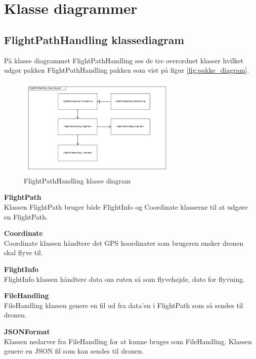 \section{Klasse diagrammer}

\subsection{FlightPathHandling klassediagram}
På klasse diagrammet FlightPathHandling ses de tre overordnet klasser hvilket udgør pakken FlightPathHandling pakken som vist på figur \ref{fig:pakke_diagram}.

\vspace{-5pt}
\begin{figure}[H]
	\centering
	\includegraphics[width=0.7\textwidth]{Billeder/klasse_diagrammer/FlightPathHandlingDiagram.png}
	\vspace{-5pt}
	\caption{FlightPathHandling klasse diagram}
	\label{fig:FlightPathHandling_klasse_diagram}
\end{figure}

\textbf{FlightPath}\\
Klassen FlightPath bruger både FlightInfo og Coordinate klasserne til at udgøre en FlightPath.

\textbf{Coordinate}\\
Coordinate klassen håndtere det GPS koordinater som brugeren ønsker dronen skal flyve til.

\textbf{FlightInfo}\\
FlightInfo klassen håndtere data om ruten så som flyvehøjde, dato for flyvning.

\textbf{FileHandling}\\
FileHandling klassen genere en fil ud fra data'en i FlightPath som så sendes til dronen.

\textbf{JSONFormat}\\
Klassen nedarver fra FileHandling for at kunne bruges som FileHandling. Klassen genere en JSON fil som kan sendes til dronen.

